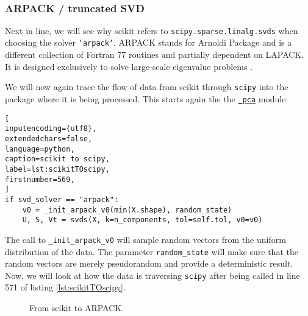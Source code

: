 \ \clearpage


\subsubsection{ARPACK / truncated SVD}

Next in line, we will see why \gls{scikit} refers to \texttt{scipy.sparse.linalg.svds} when choosing the solver \texttt{`arpack`}. 
ARPACK stands for Arnoldi Package and is a different collection of Fortran 77 routines and partially dependent on LAPACK.
It is designed exclusively to solve large-scale eigenvalue problems \cite{lehoucq1998arpack}.
\medskip


We will now again trace the flow of data from \gls{scikit} through \texttt{scipy} into the package where it is being processed.
This starts again the the \href{\scikitPCAvIxOxI{_pca}}{\texttt{\_pca}} module:

\begin{lstlisting}[
inputencoding={utf8}, 
extendedchars=false, 
language=python, 
caption=scikit to scipy, 
label=lst:scikitTOscipy,
firstnumber=569,
]
if svd_solver == "arpack":
    v0 = _init_arpack_v0(min(X.shape), random_state)
    U, S, Vt = svds(X, k=n_components, tol=self.tol, v0=v0)
\end{lstlisting}

\noindent
The call to \texttt{\_init\_arpack\_v0} will sample random vectors from the uniform distribution of the data.
The parameter \texttt{random\_state} will make sure that the random vectors are merely pseudorandom and provide a deterministic result.
Now, we will look at how the data is traversing \texttt{scipy} after being called in line 571 of listing \ref{lst:scikitTOscipy}.
\bigskip

\renewcommand{\tikzscale}{0.65}
\begin{figure}[h]
	\centering
	
	\captionsetup{justification=centering}
	\vspace*{5mm}
	\caption{From scikit to ARPACK.}
	\label{fig:scikitToARPACK}
\end{figure}
\bigskip


